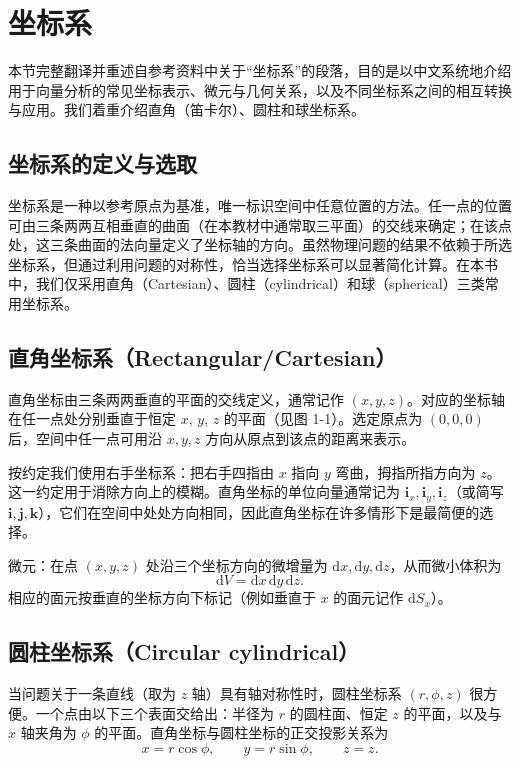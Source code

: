 \section{坐标系}

本节完整翻译并重述自参考资料中关于“坐标系”的段落，目的是以中文系统地介绍用于向量分析的常见坐标表示、微元与几何关系，以及不同坐标系之间的相互转换与应用。我们着重介绍直角（笛卡尔）、圆柱和球坐标系。

\subsection{坐标系的定义与选取}
坐标系是一种以参考原点为基准，唯一标识空间中任意位置的方法。任一点的位置可由三条两两互相垂直的曲面（在本教材中通常取三平面）的交线来确定；在该点处，这三条曲面的法向量定义了坐标轴的方向。虽然物理问题的结果不依赖于所选坐标系，但通过利用问题的对称性，恰当选择坐标系可以显著简化计算。在本书中，我们仅采用直角（Cartesian）、圆柱（cylindrical）和球（spherical）三类常用坐标系。

\subsection{直角坐标系（Rectangular/Cartesian）}
直角坐标由三条两两垂直的平面的交线定义，通常记作 $(x,y,z)$。对应的坐标轴在任一点处分别垂直于恒定 $x$, $y$, $z$ 的平面（见图 1-1）。选定原点为 $(0,0,0)$ 后，空间中任一点可用沿 $x,y,z$ 方向从原点到该点的距离来表示。

按约定我们使用右手坐标系：把右手四指由 $x$ 指向 $y$ 弯曲，拇指所指方向为 $z$。这一约定用于消除方向上的模糊。直角坐标的单位向量通常记为 $\mathbf{i}_x,\mathbf{i}_y,\mathbf{i}_z$（或简写 $\mathbf{i},\mathbf{j},\mathbf{k}$），它们在空间中处处方向相同，因此直角坐标在许多情形下是最简便的选择。

微元：在点 $(x,y,z)$ 处沿三个坐标方向的微增量为 $\mathrm{d}x,\mathrm{d}y,\mathrm{d}z$，从而微小体积为
\[
\mathrm{d}V=\mathrm{d}x\,\mathrm{d}y\,\mathrm{d}z.
\]
相应的面元按垂直的坐标方向下标记（例如垂直于 $x$ 的面元记作 $\mathrm{d}S_x$）。

\subsection{圆柱坐标系（Circular cylindrical）}
当问题关于一条直线（取为 $z$ 轴）具有轴对称性时，圆柱坐标系 $(r,\phi,z)$ 很方便。一个点由以下三个表面交给出：半径为 $r$ 的圆柱面、恒定 $z$ 的平面，以及与 $x$ 轴夹角为 $\phi$ 的平面。直角坐标与圆柱坐标的正交投影关系为
\[
x=r\cos\phi,\qquad y=r\sin\phi,\qquad z=z.
\]

